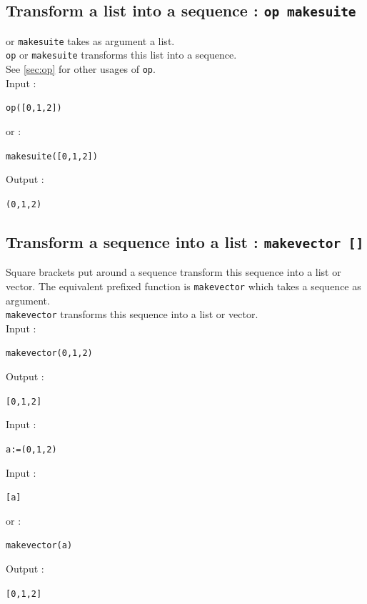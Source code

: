 \documentclass[a4paper,11pt]{book}
\begin{document}
\subsection{Transform a list into a sequence : {\tt op makesuite}}
 or {\tt makesuite} takes as argument a list.\\
{\tt op} or {\tt makesuite} transforms this list into a sequence.
\label{sec:makesuiteop}\\
See \ref{sec:op} for other usages of {\tt op}.\\
Input :
\begin{center}{\tt op([0,1,2])}\end{center}
or :
\begin{center}{\tt makesuite([0,1,2])}\end{center}
Output :
\begin{center}{\tt (0,1,2)}\end{center}

\subsection{Transform a sequence into a list : {\tt makevector []}}\index{[]}
Square brackets put around a sequence transform this sequence into a list 
or vector. The equivalent prefixed function is
{\tt makevector} which takes a sequence as argument.\\
{\tt makevector} transforms this sequence into a list or vector.\\
Input :
\begin{center}{\tt makevector(0,1,2)}\end{center}
Output :
\begin{center}{\tt [0,1,2]}\end{center}
Input :
\begin{center}{\tt a:=(0,1,2)}\end{center}
Input :
\begin{center}{\tt [a]}\end{center}
or :
\begin{center}{\tt makevector(a)}\end{center}
Output :
\begin{center}{\tt [0,1,2]}\end{center}
\end{document}
